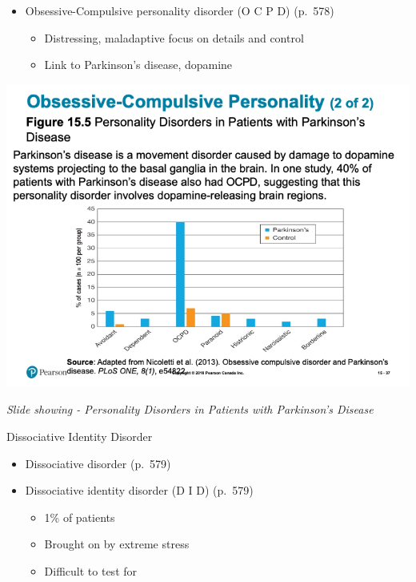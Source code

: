 \documentclass[
]{book}
\providecommand{\tightlist}{%
  \setlength{\itemsep}{0pt}\setlength{\parskip}{0pt}}
\begin{document}
\begin{reflect}
\begin{itemize}
\tightlist
\item
  Obsessive-Compulsive personality disorder (O C P D) (p.~578)

  \begin{itemize}
  \tightlist
  \item
    Distressing, maladaptive focus on details and control\\
  \item
    Link to Parkinson's disease, dopamine
  \end{itemize}
\end{itemize}

\includegraphics{assets/unit_10/slide_37.png}

\emph{Slide showing - Personality Disorders in Patients with Parkinson's Disease }

Dissociative Identity Disorder

\begin{itemize}
\tightlist
\item
  Dissociative disorder (p.~579)\\
\item
  Dissociative identity disorder (D I D) (p.~579)

  \begin{itemize}
  \tightlist
  \item
    1\% of patients\\
  \item
    Brought on by extreme stress\\
  \item
    Difficult to test for
  \end{itemize}
\end{itemize}


\end{reflect}
\end{document}
